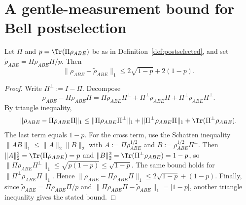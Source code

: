 \section{A gentle-measurement bound for Bell postselection}

\begin{lemma}
\label{lem:gentle-postselect}
\notready
Let $\Pi$ and $p=\Tr(\Pi\rho_{ABE})$ be as in Definition~\ref{def:postselected}, and set $\widetilde\rho_{ABE}=\Pi\rho_{ABE}\Pi/p$.
Then
\[
\|\rho_{ABE}-\widetilde\rho_{ABE}\|_1 \le 2\sqrt{1-p}+2(1-p).
\]
\end{lemma}

\begin{proof}
Write $\Pi^\perp:=I-\Pi$.
Decompose
\[
\rho_{ABE}-\Pi\rho_{ABE}\Pi
= \Pi\rho_{ABE}\Pi^\perp + \Pi^\perp\rho_{ABE}\Pi + \Pi^\perp\rho_{ABE}\Pi^\perp.
\]
By triangle inequality,
\[
\|\rho_{ABE}-\Pi\rho_{ABE}\Pi\|_1
\le \|\Pi\rho_{ABE}\Pi^\perp\|_1+\|\Pi^\perp\rho_{ABE}\Pi\|_1 + \Tr(\Pi^\perp\rho_{ABE}).
\]
The last term equals $1-p$.
For the cross term, use the Schatten inequality $\|AB\|_1\le \|A\|_2\|B\|_2$ with
$A:=\Pi\rho_{ABE}^{1/2}$ and $B:=\rho_{ABE}^{1/2}\Pi^\perp$. Then
\(
\|A\|_2^2=\Tr(\Pi\rho_{ABE})=p
\) and \(
\|B\|_2^2=\Tr(\Pi^\perp\rho_{ABE})=1-p
\), so
\(
\|\Pi\rho_{ABE}\Pi^\perp\|_1\le \sqrt{p(1-p)}\le\sqrt{1-p}.
\)
The same bound holds for $\|\Pi^\perp\rho_{ABE}\Pi\|_1$.
Hence $\|\rho_{ABE}-\Pi\rho_{ABE}\Pi\|_1\le 2\sqrt{1-p}+(1-p)$.
Finally, since $\widetilde\rho_{ABE}=\Pi\rho_{ABE}\Pi/p$ and $\|\Pi\rho_{ABE}\Pi - \widetilde\rho_{ABE}\|_1 = |1-p|$, another triangle inequality gives the stated bound.
\end{proof}

